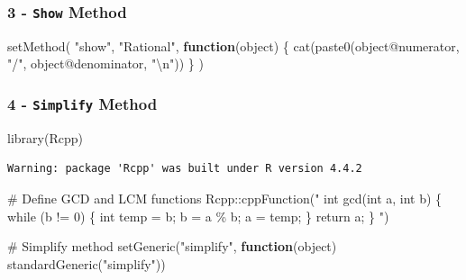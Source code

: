 \documentclass[
  12pt,
]{article}
\newenvironment{Shaded}{\begin{snugshade}}{\end{snugshade}}
\newcommand{\CommentTok}[1]{\textcolor[rgb]{0.37,0.37,0.37}{#1}}
\newcommand{\ControlFlowTok}[1]{\textcolor[rgb]{0.00,0.23,0.31}{\textbf{#1}}}
\newcommand{\FunctionTok}[1]{\textcolor[rgb]{0.28,0.35,0.67}{#1}}
\newcommand{\NormalTok}[1]{\textcolor[rgb]{0.00,0.23,0.31}{#1}}
\newcommand{\SpecialCharTok}[1]{\textcolor[rgb]{0.37,0.37,0.37}{#1}}
\newcommand{\StringTok}[1]{\textcolor[rgb]{0.13,0.47,0.30}{#1}}
\begin{document}
\subsubsection{\texorpdfstring{3 - \texttt{Show}
Method}{3 - Show Method}}\label{show-method}

\begin{Shaded}
\begin{Highlighting}[]
\FunctionTok{setMethod}\NormalTok{(}
  \StringTok{"show"}\NormalTok{,}
  \StringTok{"Rational"}\NormalTok{,}
  \ControlFlowTok{function}\NormalTok{(object) \{}
    \FunctionTok{cat}\NormalTok{(}\FunctionTok{paste0}\NormalTok{(object}\SpecialCharTok{@}\NormalTok{numerator, }\StringTok{"/"}\NormalTok{, object}\SpecialCharTok{@}\NormalTok{denominator, }\StringTok{"}\SpecialCharTok{\textbackslash{}n}\StringTok{"}\NormalTok{))}
\NormalTok{  \}}
\NormalTok{)}
\end{Highlighting}
\end{Shaded}

\subsubsection{\texorpdfstring{4 - \texttt{Simplify}
Method}{4 - Simplify Method}}\label{simplify-method}

\begin{Shaded}
\begin{Highlighting}[]
\FunctionTok{library}\NormalTok{(Rcpp)}
\end{Highlighting}
\end{Shaded}

\begin{verbatim}
Warning: package 'Rcpp' was built under R version 4.4.2
\end{verbatim}

\begin{Shaded}
\begin{Highlighting}[]
\CommentTok{\# Define GCD and LCM functions}
\NormalTok{Rcpp}\SpecialCharTok{::}\FunctionTok{cppFunction}\NormalTok{(}\StringTok{"}
\StringTok{int gcd(int a, int b) \{}
\StringTok{  while (b != 0) \{}
\StringTok{    int temp = b;}
\StringTok{    b = a \% b;}
\StringTok{    a = temp;}
\StringTok{  \}}
\StringTok{  return a;}
\StringTok{\}}
\StringTok{"}\NormalTok{)}

\CommentTok{\# Simplify method}
\FunctionTok{setGeneric}\NormalTok{(}\StringTok{"simplify"}\NormalTok{, }\ControlFlowTok{function}\NormalTok{(object) }\FunctionTok{standardGeneric}\NormalTok{(}\StringTok{"simplify"}\NormalTok{))}
\end{Highlighting}
\end{Shaded}
\end{document}
